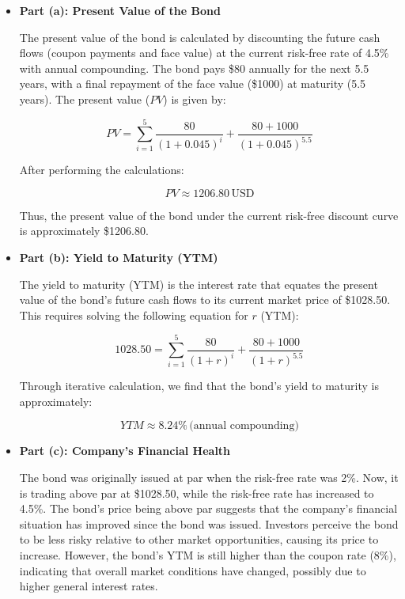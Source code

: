 \documentclass[12pt,letterpaper, onecolumn]{exam}
\begin{document}
\begin{solution}

\begin{itemize}
    \item \textbf{Part (a): Present Value of the Bond}

    The present value of the bond is calculated by discounting the future cash flows (coupon payments and face value) at the current risk-free rate of 4.5\% with annual compounding. The bond pays \$80 annually for the next 5.5 years, with a final repayment of the face value (\$1000) at maturity (5.5 years). The present value (\(PV\)) is given by:

    \[
    PV = \sum_{i=1}^{5} \frac{80}{(1 + 0.045)^i} + \frac{80 + 1000}{(1 + 0.045)^{5.5}}
    \]

    After performing the calculations:

    \[
    PV \approx 1206.80 \, \text{USD}
    \]

    Thus, the present value of the bond under the current risk-free discount curve is approximately \$1206.80.

    \item \textbf{Part (b): Yield to Maturity (YTM)}

    The yield to maturity (YTM) is the interest rate that equates the present value of the bond’s future cash flows to its current market price of \$1028.50. This requires solving the following equation for \( r \) (YTM):

    \[
    1028.50 = \sum_{i=1}^{5} \frac{80}{(1 + r)^i} + \frac{80 + 1000}{(1 + r)^{5.5}}
    \]

    Through iterative calculation, we find that the bond’s yield to maturity is approximately:

    \[
    YTM \approx 8.24\% \, \text{(annual compounding)}
    \]

    \item \textbf{Part (c): Company’s Financial Health}

    The bond was originally issued at par when the risk-free rate was 2\%. Now, it is trading above par at \$1028.50, while the risk-free rate has increased to 4.5\%. The bond’s price being above par suggests that the company's financial situation has improved since the bond was issued. Investors perceive the bond to be less risky relative to other market opportunities, causing its price to increase. However, the bond's YTM is still higher than the coupon rate (8\%), indicating that overall market conditions have changed, possibly due to higher general interest rates.
    
\end{itemize}

\end{solution}
\end{document}
